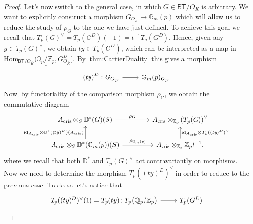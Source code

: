 \begin{proof}
	Let's now switch to the general case, in which $G \in \mathsf{BT}/O_K$
	is arbitrary.
	We want to explicitly construct a morphism $G_{O_{\overline{K}}} \to \mathbb{G}_m(p)$
	which will allow us to reduce the study of $\rho_G$ to the one we have just defined.
	To achieve this goal we recall that $T_p(G)^\vee = T_p(G^D)(-1) = t^{-1}T_p(G^D)$.
	Hence, given any $y \in T_p(G)^\vee$, we obtain $ty \in T_p(G^D)$,
	which can be interpreted as a map in 
	$\mathrm{Hom}_{ \mathsf{BT}/O_{\overline{K}} } 
	\big( \underline{\mathbb{Q}_p/\mathbb{Z}_{p}}, G^D_{O_{\overline{K}}}\big)$.
	By \cref{thm:CartierDuality} this gives a morphism
	\begin{equation*}
	\begin{tikzcd}[row sep = 0ex
		,/tikz/column 1/.append style={anchor=base east}
		,/tikz/column 2/.append style={anchor=base west}]
		\left( ty \right)^D\colon G_{O_{\overline{K}}}
		\arrow[r, "", rightarrow] &
		\mathbb{G}_m(p)_{O_{\overline{K}}}
	\end{tikzcd}
	\end{equation*} 
	Now, by functoriality of the comparison morphism $\rho_G$, we obtain the commutative
	diagram
	\begin{equation*}
	\begin{tikzcd}[column sep=4.0em]
		A_{\mathrm{cris}} \otimes_S \mathbb{D}^*(G)(S)
		\arrow[r, "\rho_G", rightarrow] &
		A_{\mathrm{cris}} \otimes_{\mathbb{Z}_{p}} \left( T_p(G) \right)^\vee \\
		A_{\mathrm{cris}} \otimes_S \mathbb{D}^*(\mathbb{G}_m(p))(S)
		\arrow[r, "\rho_{\mathbb{G}_m(p)}", rightarrow] 
		\arrow[u, "\mathrm{id}_{ A_{\mathrm{cris}} } \otimes \mathbb{D}^*((ty)^D)(A_{\mathrm{cris}})", rightarrow] &
		A_{\mathrm{cris}} \otimes_{\mathbb{Z}_{p}} \mathbb{Z}_{p} t^{-1}
		\arrow[u, "\mathrm{id}_{ A_{\mathrm{cris}} } \otimes T_p ((ty)^D)^\vee"', rightarrow] 
	,\end{tikzcd}
	\end{equation*}
	where we recall that both $\mathbb{D}^*$ and $T_p(G)^\vee$ act contravariantly on morphisms.
	Now we need to determine the morphism $T_p((ty)^D)^\vee$ in order to reduce to the previous case.
	To do so let's notice that 
	\begin{equation*}
	\begin{tikzcd}[row sep = 0ex
		,/tikz/column 1/.append style={anchor=base east}
		,/tikz/column 2/.append style={anchor=base west}]
		T_p((ty)^D)^\vee(1) = T_p(ty)\colon 
		T_p \big( \underline{\mathbb{Q}_p/\mathbb{Z}_{p}} \big)
		\arrow[r, "", rightarrow] &
		T_p(G^D)\\

\end{tikzcd}
\end{equation*}
\end{proof}
